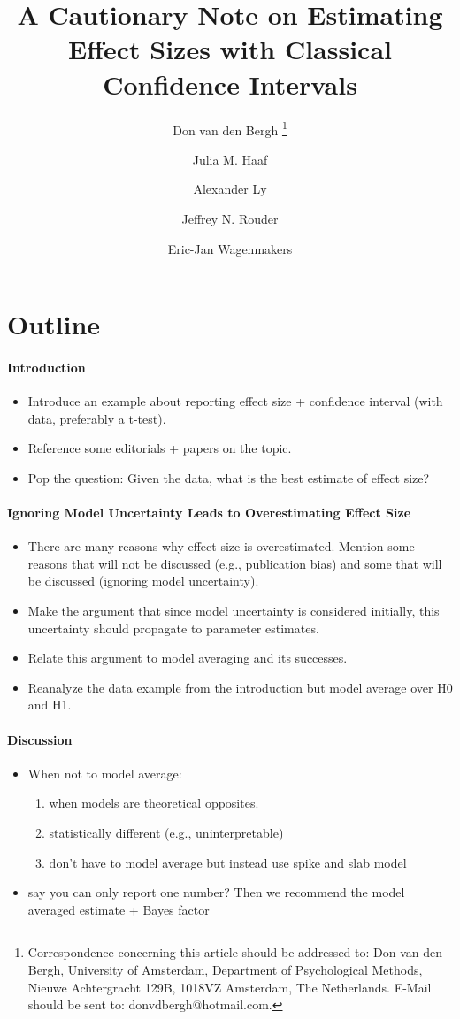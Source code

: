 \documentclass[a4paper]{article}
\title{A Cautionary Note on Estimating Effect Sizes with Classical Confidence Intervals}
\author[1]{Don van den Bergh%
	\thanks{Correspondence concerning this article should be addressed to: Don van den Bergh, University of Amsterdam, Department of Psychological Methods, Nieuwe Achtergracht 129B, 1018VZ Amsterdam, The Netherlands. E-Mail should be sent to: donvdbergh@hotmail.com.
}}
\author[1]{Julia M. Haaf}
\author[1,2]{Alexander Ly}
\author[3]{\authorcr Jeffrey N. Rouder} %
\author[1]{Eric-Jan Wagenmakers}
\affil[1]{University of Amsterdam}
\affil[2]{Centrum Wiskunde \& Informatica}
\affil[3]{University of California Irvine}
\date{}
\begin{document}
	\section*{Outline}

\paragraph{Introduction}
\begin{itemize}
	\item Introduce an example about reporting effect size + confidence interval (with data, preferably a t-test). 
	\item Reference some editorials + papers on the topic.
	\item Pop the question: Given the data, what is the best estimate of effect size?
\end{itemize}
\paragraph{Ignoring Model Uncertainty Leads to Overestimating Effect Size}
\begin{itemize}
	\item There are many reasons why effect size is overestimated. Mention some reasons that will not be discussed (e.g., publication bias) and some that will be discussed (ignoring model uncertainty).
	\item Make the argument that since model uncertainty is considered initially, this uncertainty should propagate to parameter estimates.
	\item Relate this argument to model averaging and its successes.
	\item Reanalyze the data example from the introduction but model average over H0 and H1.
\end{itemize}
\paragraph{Discussion}
\begin{itemize}
	\item When not to model average:
	\begin{enumerate}
		\item when models are theoretical opposites.
		\item statistically different (e.g., uninterpretable)
		\item don't have to model average but instead use spike and slab model
	\end{enumerate}
	\item say you can only report one number? Then we recommend the model averaged estimate + Bayes factor
\end{itemize}
\end{document}
